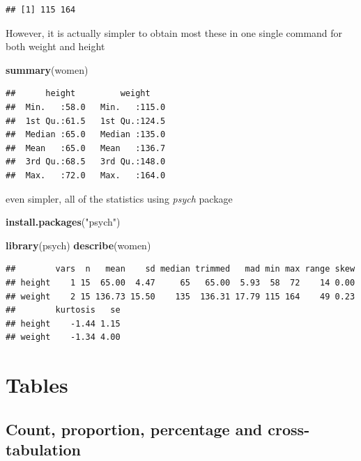 \documentclass[]{book}
\newenvironment{Shaded}{\begin{snugshade}}{\end{snugshade}}
\newcommand{\KeywordTok}[1]{\textcolor[rgb]{0.13,0.29,0.53}{\textbf{#1}}}
\newcommand{\StringTok}[1]{\textcolor[rgb]{0.31,0.60,0.02}{#1}}
\newcommand{\NormalTok}[1]{#1}
\theoremstyle{definition}
\theoremstyle{definition}
\theoremstyle{remark}
\begin{document}
\begin{verbatim}
## [1] 115 164
\end{verbatim}

However, it is actually simpler to obtain most these in one single
command for both weight and height

\begin{Shaded}
\begin{Highlighting}[]
\KeywordTok{summary}\NormalTok{(women)}
\end{Highlighting}
\end{Shaded}

\begin{verbatim}
##      height         weight     
##  Min.   :58.0   Min.   :115.0  
##  1st Qu.:61.5   1st Qu.:124.5  
##  Median :65.0   Median :135.0  
##  Mean   :65.0   Mean   :136.7  
##  3rd Qu.:68.5   3rd Qu.:148.0  
##  Max.   :72.0   Max.   :164.0
\end{verbatim}

even simpler, all of the statistics using \emph{psych} package

\begin{Shaded}
\begin{Highlighting}[]
\KeywordTok{install.packages}\NormalTok{(}\StringTok{"psych"}\NormalTok{)}
\end{Highlighting}
\end{Shaded}

\begin{Shaded}
\begin{Highlighting}[]
\KeywordTok{library}\NormalTok{(psych)}
\KeywordTok{describe}\NormalTok{(women)}
\end{Highlighting}
\end{Shaded}

\begin{verbatim}
##        vars  n   mean    sd median trimmed   mad min max range skew
## height    1 15  65.00  4.47     65   65.00  5.93  58  72    14 0.00
## weight    2 15 136.73 15.50    135  136.31 17.79 115 164    49 0.23
##        kurtosis   se
## height    -1.44 1.15
## weight    -1.34 4.00
\end{verbatim}

\section{Tables}\label{tables}

\subsection{Count, proportion, percentage and
cross-tabulation}\label{count-proportion-percentage-and-cross-tabulation}
\end{document}
